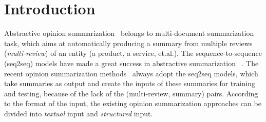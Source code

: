 \section{Introduction}
\label{sec:intro}


Abstractive opinion summarization~\cite{GeraniMCNN14} belongs to multi-document summarization task,
which aims at automatically
producing a summary from multiple reviews ({\em multi-review})
of an entity 
(a product, a service, et.al.). 
The sequence-to-sequence (seq2seq) models 
have made a great success 
in abstractive summarization
~\cite{NallapatiZSGX16,SeeLM17,LiuLZ18,CelikyilmazBHC18,BART20}. 
The recent opinion summarization methods~\cite{Copycat20, Denoise20, Fewshot20, Plansum20} 
always adopt the seq2seq models, which take summaries as output and create the inputs of these summaries for training and testing,
because of the lack of the (multi-review, summary) pairs.
According to the format of the input, the existing opinion summarization approaches can be
divided into {\em textual} input 
and  {\em structured} input.

